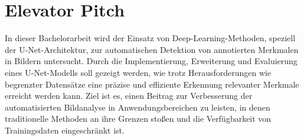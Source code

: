 \chapter{Elevator Pitch}\label{sec:exp_elevator}
In dieser Bachelorarbeit wird der Einsatz von Deep-Learning-Methoden, speziell der U-Net-Architektur, zur automatischen Detektion von annotierten Merkmalen in Bildern untersucht. Durch die Implementierung, Erweiterung und Evaluierung eines U-Net-Modells soll gezeigt werden, wie trotz Herausforderungen wie begrenzter Datensätze eine präzise und effiziente Erkennung relevanter Merkmale erreicht werden kann. Ziel ist es, einen Beitrag zur Verbesserung der automatisierten Bildanalyse in Anwendungsbereichen zu leisten, in denen traditionelle Methoden an ihre Grenzen stoßen und die Verfügbarkeit von Trainingsdaten eingeschränkt ist.














